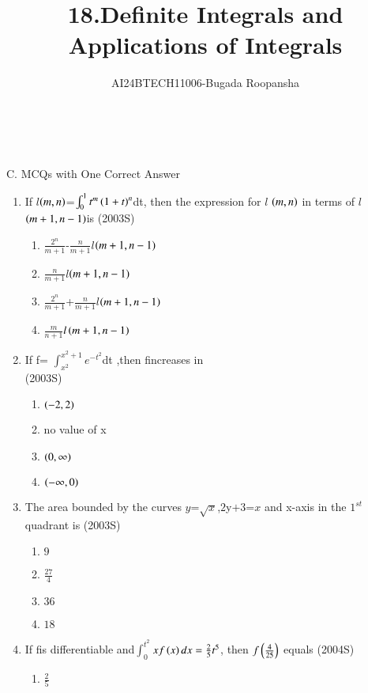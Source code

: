 \documentclass[journal,12pt,twocolumn]{IEEEtran}
\theoremstyle{remark}
\begin{document}

\vspace{3cm}

\title{18.Definite Integrals and Applications of Integrals}
\author{AI24BTECH11006-Bugada Roopansha}

\\\\{C. MCQs with One Correct Answer}    
\begin{enumerate}[start=21]
\item If $l$$\left(m,n\right)$=$\int_{0}^{1}t^m\left(1+t\right)^n$dt, then the expression for $l$ $\left(m,n\right)$ in terms of $l$$\left(m+1,n-1\right)$is
\hfill{(2003S)}
\begin{enumerate}
\item $\frac{2^n}{m+1}$-$\frac{n}{m+1}$$l$$\left(m+1,n-1\right)$
\item $\frac{n}{m+1}$$l$$\left(m+1,n-1\right)$
\item $\frac{2^n}{m+1}$+$\frac{n}{m+1}$$l$$\left(m+1,n-1\right)$
\item $\frac{m}{n+1}$$l
\left(m+1,n-1\right)$
\end{enumerate}
\item If f= $\int_{x^2}^{x^2+1}e^{-t^2}$dt ,then fincreases in\\
\hfill{(2003S)}
\begin{enumerate}
\item  $\left(-2,2\right)$
\item no value of x
\item  $\left(0,\infty\right)$
\item  $\left(-\infty,0\right)$
\end{enumerate}
\item The area bounded by the curves  $y$=$\sqrt{x}$,$2$y$+3$=$x$ and x-axis in the $1^{st}$quadrant is
\hfill{(2003S)}
\begin{enumerate}
\item $9$
\item$\frac{27}{4}$
\item $36$
\item $18$
\end{enumerate}
\item If fis differentiable and$\int_{0}^{t^2}$$xf\left(x\right)dx=\frac{2}{5}t^5$, then $f\left(\frac{4}{25}\right)$ equals
\hfill{(2004S)}
\begin{enumerate}
\item $\frac{2}{5}$

\end{enumerate}$$
\end{enumerate}
\end{document}
